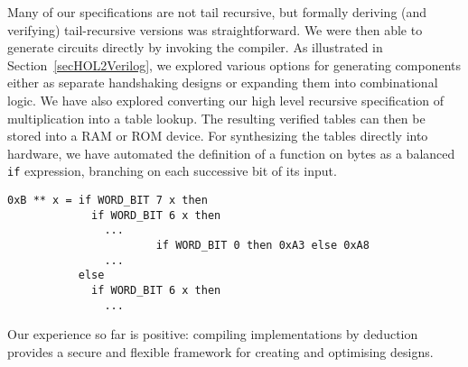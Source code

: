 Many of our specifications are not tail recursive, but formally
deriving (and verifying) tail-recursive versions was
straightforward. We were then able to generate circuits directly by invoking
the compiler.  As illustrated in
Section~\ref{secHOL2Verilog}, we explored various options for
generating components either as separate handshaking designs or expanding
them into combinational logic. We have also explored converting our
high level recursive specification of multiplication into a table
lookup. The resulting verified tables can then be stored into a RAM or
ROM device.  For synthesizing the tables directly into hardware, we
have automated the definition of a function on bytes as a balanced
\texttt{if} expression, branching on each successive bit of its input.

\vspace*{-2mm}

{\footnotesize\baselineskip10pt\begin{verbatim}
0xB ** x = if WORD_BIT 7 x then
             if WORD_BIT 6 x then 
               ...
                       if WORD_BIT 0 then 0xA3 else 0xA8
               ...
           else
             if WORD_BIT 6 x then
               ...
\end{verbatim}}

\vspace*{-2mm}

Our experience so far is positive: compiling implementations by
deduction provides a secure and flexible framework for creating and
optimising designs.




